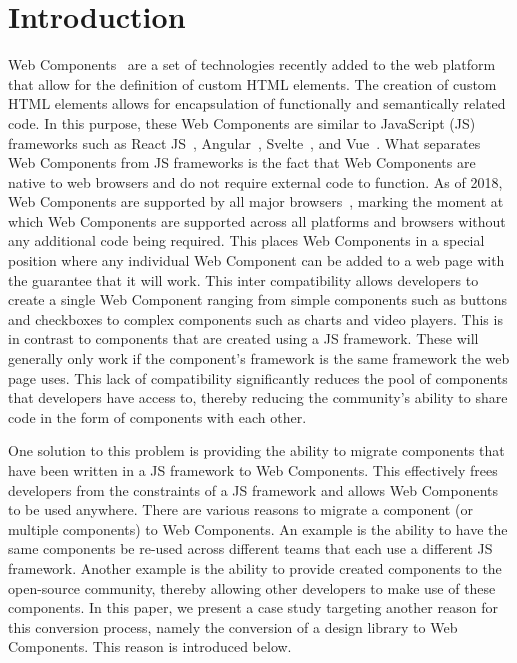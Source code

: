 \chapter{Introduction}
Web Components~ are a set of technologies recently added to the web platform that allow for the definition of custom HTML elements. The creation of custom HTML elements allows for encapsulation of functionally and semantically related code. In this purpose, these Web Components are similar to JavaScript (JS) frameworks such as React JS~, Angular~, Svelte~, and Vue~. What separates Web Components from JS frameworks is the fact that Web Components are native to web browsers and do not require external code to function. As of 2018, Web Components are supported by all major browsers~, marking the moment at which Web Components are supported across all platforms and browsers without any additional code being required. This places Web Components in a special position where any individual Web Component can be added to a web page with the guarantee that it will work. This inter compatibility allows developers to create a single Web Component ranging from simple components such as buttons and checkboxes to complex components such as charts and video players. This is in contrast to components that are created using a JS framework. These will generally only work if the component's framework is the same framework the web page uses. This lack of compatibility significantly reduces the pool of components that developers have access to, thereby reducing the community's ability to share code in the form of components with each other.

One solution to this problem is providing the ability to migrate components that have been written in a JS framework to Web Components. This effectively frees developers from the constraints of a JS framework and allows Web Components to be used anywhere. There are various reasons to migrate a component (or multiple components) to Web Components. An example is the ability to have the same components be re-used across different teams that each use a different JS framework. Another example is the ability to provide created components to the open-source community, thereby allowing other developers to make use of these components. In this paper, we present a case study targeting another reason for this conversion process, namely the conversion of a design library to Web Components. This reason is introduced below.

